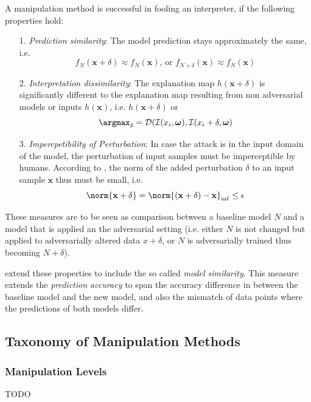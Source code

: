A manipulation method is successful in fooling an interpreter, if the following properties hold: 
\begin{enumerate}
    \item[1.] \textit{Prediction similarity}: The model prediction stays approximately the same, i.e. $$f_N(\mathbf{x}+\delta) \approx f_N(\mathbf{x}) \text{, or } f_{N+\delta}(\mathbf{x}) \approx f_N(\mathbf{x})$$
    \item[2.] \textit{Interpretation dissimilarity}: The explanation map $h(\mathbf{x}+\delta)$ is significantly different to the explanation map resulting from non adversarial models or inputs $h(\mathbf{x})$, i.e. $h(\mathbf{x}+\delta)$ or $$\argmax_{\delta} = \mathcal{D}(\mathcal{I}(x_i, \boldsymbol{\omega}), \mathcal{I}(x_i+\delta, \boldsymbol{\omega})$$
    \item[3.] \textit{Impercpetibility of Perturbation}: In case the attack is in the input domain of the model, the perturbation of input samples must be imperceptible by humans. According to \cite{dombrowski2019explanations}, the norm of the added perturbation $\delta$ to an input sample $\mathbf{x}$ thus must be small, i.e. $$\norm{\mathbf{x}+\delta} = \norm{(\mathbf{x}+\delta)-\mathbf{x}}_{\inf} \leq \epsilon$$ %
\end{enumerate}
\setlength{\leftskip}{0cm}

These measures are to be seen as comparison between a baseline model $N$ and a model that is applied an the adversarial setting (i.e. either $N$ is not changed but applied to adversarially altered data $x+\delta$, or $N$ is adversarially trained thus becoming $N+\delta$). 

\cite{dimanov2020you} extend these properties to include the so called \textit{model similarity}. This measure extends the \textit{prediction accuracy} to span the accuracy difference in between the baseline model and the new model, and also the mismatch of data points where the predictions of both models differ. 


\subsection{Taxonomy of Manipulation Methods}
\label{subsec:taxonomy_manipulations}

\subsubsection{Manipulation Levels}
\label{subsubsec:manipulation_levels}
\par\smallskip
\noindent 
TODO

